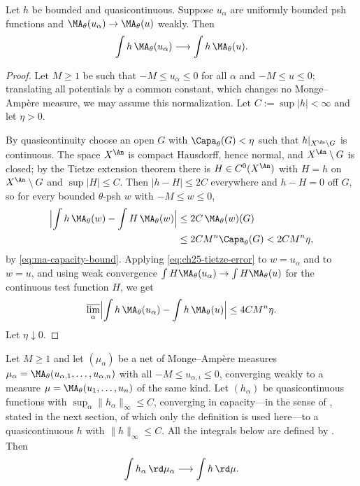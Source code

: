 \begin{lemma}
\label{lem:quasicontinuous-tests}
Let $h$ be bounded and quasicontinuous. Suppose $u_\alpha$ are uniformly
bounded psh functions and
$\MA_\theta(u_\alpha)\to\MA_\theta(u)$ weakly. Then
\[
                    \int h\,\MA_\theta(u_\alpha)
                    \longrightarrow\int h\,\MA_\theta(u).
\]
\end{lemma}

\begin{proof}
Let $M\geq1$ be such that $-M\leq u_\alpha\leq0$ for all $\alpha$ and
$-M\leq u\leq0$; translating all potentials by a common constant, which
changes no Monge--Amp\`ere measure, we may assume this normalization.  Let
$C:=\sup|h|<\infty$ and let $\eta>0$.

By quasicontinuity choose an open $G$ with
$\Capa_\theta(G)<\eta$ such that $h|_{X^{\An}\setminus G}$ is continuous.
The space $X^{\An}$ is compact Hausdorff, hence normal, and
$X^{\An}\setminus G$ is closed; by the Tietze extension theorem there is
$H\in C^0(X^{\An})$ with $H=h$ on $X^{\An}\setminus G$ and
$\sup|H|\leq C$.  Then $|h-H|\leq2C$ everywhere and $h-H=0$ off
$G$, so for every bounded $\theta$-psh $w$ with $-M\leq w\leq0$,
\begin{equation}
\label{eq:ch25-tietze-error}
 \begin{aligned}
 \Bigl|\int h\,\MA_\theta(w)-\int H\,\MA_\theta(w)\Bigr|
 &\leq2C\,\MA_\theta(w)(G)\\
 &\leq2CM^n\Capa_\theta(G)<2CM^n\eta ,
 \end{aligned}
\end{equation}
by \eqref{eq:ma-capacity-bound}.  Applying
\eqref{eq:ch25-tietze-error} to $w=u_\alpha$ and to $w=u$, and using
weak convergence $\int H\MA_\theta(u_\alpha)\to\int H\MA_\theta(u)$ for the
continuous test function $H$, we get
\[
 \varlimsup_\alpha\Bigl|\int h\,\MA_\theta(u_\alpha)
   -\int h\,\MA_\theta(u)\Bigr|\leq4CM^n\eta .
\]
Let $\eta\downarrow0$.
\end{proof}

\begin{lemma}
\label{lem:ch25-joint-limit}
Let $M\geq1$ and let $(\mu_\alpha)$ be a net of Monge--Amp\`ere measures
$\mu_\alpha=\MA_\theta(u_{\alpha,1},\ldots,u_{\alpha,n})$ with all
$-M\leq u_{\alpha,i}\leq0$, converging weakly to a measure
$\mu=\MA_\theta(u_1,\ldots,u_n)$ of the same kind.  Let $(h_\alpha)$ be
quasicontinuous functions with $\sup_\alpha\|h_\alpha\|_\infty\leq C$,
converging in capacity---in the sense of
, stated in the next section, of which
only the definition is used here---to a quasicontinuous $h$ with
$\|h\|_\infty\leq C$.  All the integrals below are defined by
.  Then
\[
 \int h_\alpha\,\rd\mu_\alpha\longrightarrow\int h\,\rd\mu .
\]
\end{lemma}

